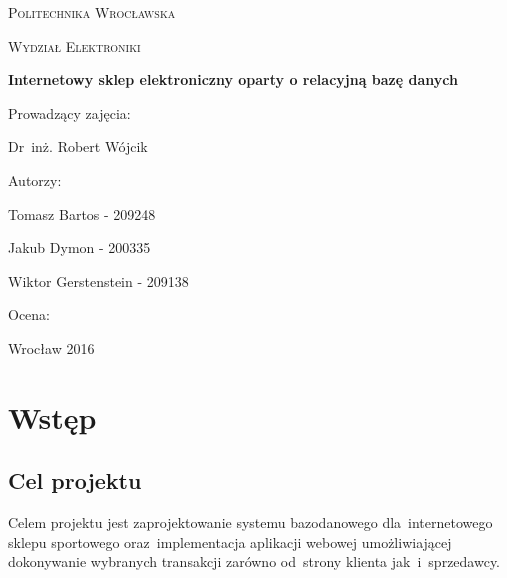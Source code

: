 \documentclass[a4paper, 12pt]{article}
\begin{document}
\begin{titlepage}
	\centering
	{\scshape\LARGE Politechnika Wrocławska \par}
	\vspace{1cm}
	{\scshape\Large Wydział Elektroniki\par}
	\vspace{1.5cm}
	{\huge\bfseries Internetowy sklep elektroniczny oparty o relacyjną bazę danych\par}
	\vspace{2cm}

	\begin{flushright}
	\Large Prowadzący zajęcia:\par
	\large Dr~inż. Robert Wójcik\\
	\end{flushright}

    \begin{flushleft}
	{\Large Autorzy:\par}
	{\large Tomasz Bartos - 209248\par}
	{\large Jakub Dymon - 200335\par}
	{\large Wiktor Gerstenstein - 209138\par}
	\end{flushleft}
	
	\begin{minipage}{0.6\textwidth}
	\begin{flushright}
	\Large Ocena:
	\end{flushright}
	\end{minipage}
	
	\vfill
	{\large Wrocław 2016\par}
\end{titlepage}

\tableofcontents
{}

\listoffigures
\cleardoublepage

\listoftables
\cleardoublepage

\section{Wstęp}
\subsection{Cel projektu}
Celem projektu jest zaprojektowanie systemu bazodanowego dla~internetowego sklepu sportowego oraz~implementacja aplikacji webowej umożliwiającej dokonywanie wybranych transakcji zarówno od~strony klienta jak~i~sprzedawcy.
\end{document}
